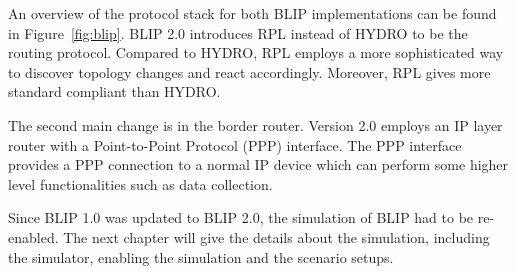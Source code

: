 An overview of the protocol stack for both BLIP implementations can be found in Figure~\ref{fig:blip}. BLIP 2.0 introduces RPL instead of HYDRO to be the routing protocol. Compared to HYDRO, RPL employs a more sophisticated way to discover topology changes and react accordingly. Moreover, RPL gives more standard compliant than HYDRO.
\newline

The second main change is in the border router. Version 2.0 employs an IP layer router with a Point-to-Point Protocol (PPP) interface. The PPP interface provides a PPP connection to a normal IP device which can perform some higher level functionalities such as data collection.
\newline

Since BLIP 1.0 was updated to BLIP 2.0, the simulation of BLIP had to be re-enabled. The next chapter will give the details about the simulation, including the simulator, enabling the simulation and the scenario setups.

